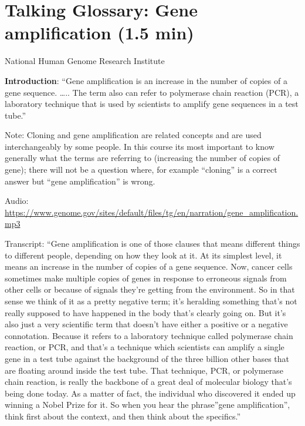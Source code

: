 \documentclass[
]{book}
\begin{document}
\hypertarget{talking-glossary-gene-amplification-1.5-min}{%
\section{Talking Glossary: Gene amplification (1.5 min)}\label{talking-glossary-gene-amplification-1.5-min}}

National Human Genome Research Institute

\textbf{Introduction}: ``Gene amplification is an increase in the number of copies of a gene sequence. \ldots.. The term also can refer to polymerase chain reaction (PCR), a laboratory technique that is used by scientists to amplify gene sequences in a test tube.''

Note: Cloning and gene amplification are related concepts and are used interchangeably by some people. In this course its most important to know generally what the terms are referring to (increasing the number of copies of gene); there will not be a question where, for example ``cloning'' is a correct answer but ``gene amplification'' is wrong.

Audio: \url{https://www.genome.gov/sites/default/files/tg/en/narration/gene_amplification.mp3}

Transcript: ``Gene amplification is one of those clauses that means different things to different people, depending on how they look at it. At its simplest level, it means an increase in the number of copies of a gene sequence. Now, cancer cells sometimes make multiple copies of genes in response to erroneous signals from other cells or because of signals they're getting from the environment. So in that sense we think of it as a pretty negative term; it's heralding something that's not really supposed to have happened in the body that's clearly going on. But it's also just a very scientific term that doesn't have either a positive or a negative connotation. Because it refers to a laboratory technique called polymerase chain reaction, or PCR, and that's a technique which scientists can amplify a single gene in a test tube against the background of the three billion other bases that are floating around inside the test tube. That technique, PCR, or polymerase chain reaction, is really the backbone of a great deal of molecular biology that's being done today. As a matter of fact, the individual who discovered it ended up winning a Nobel Prize for it. So when you hear the phrase''gene amplification'', think first about the context, and then think about the specifics.''
\end{document}
